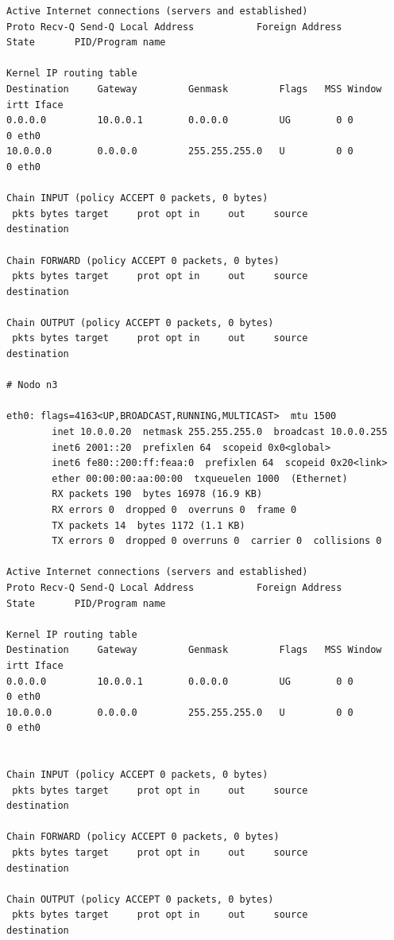 \begin{lstlisting}
Active Internet connections (servers and established)
Proto Recv-Q Send-Q Local Address           Foreign Address         State       PID/Program name 

Kernel IP routing table
Destination     Gateway         Genmask         Flags   MSS Window  irtt Iface
0.0.0.0         10.0.0.1        0.0.0.0         UG        0 0          0 eth0
10.0.0.0        0.0.0.0         255.255.255.0   U         0 0          0 eth0

Chain INPUT (policy ACCEPT 0 packets, 0 bytes)
 pkts bytes target     prot opt in     out     source               destination         

Chain FORWARD (policy ACCEPT 0 packets, 0 bytes)
 pkts bytes target     prot opt in     out     source               destination         

Chain OUTPUT (policy ACCEPT 0 packets, 0 bytes)
 pkts bytes target     prot opt in     out     source               destination 

# Nodo n3

eth0: flags=4163<UP,BROADCAST,RUNNING,MULTICAST>  mtu 1500
        inet 10.0.0.20  netmask 255.255.255.0  broadcast 10.0.0.255
        inet6 2001::20  prefixlen 64  scopeid 0x0<global>
        inet6 fe80::200:ff:feaa:0  prefixlen 64  scopeid 0x20<link>
        ether 00:00:00:aa:00:00  txqueuelen 1000  (Ethernet)
        RX packets 190  bytes 16978 (16.9 KB)
        RX errors 0  dropped 0  overruns 0  frame 0
        TX packets 14  bytes 1172 (1.1 KB)
        TX errors 0  dropped 0 overruns 0  carrier 0  collisions 0

Active Internet connections (servers and established)
Proto Recv-Q Send-Q Local Address           Foreign Address         State       PID/Program name    

Kernel IP routing table
Destination     Gateway         Genmask         Flags   MSS Window  irtt Iface
0.0.0.0         10.0.0.1        0.0.0.0         UG        0 0          0 eth0
10.0.0.0        0.0.0.0         255.255.255.0   U         0 0          0 eth0


Chain INPUT (policy ACCEPT 0 packets, 0 bytes)
 pkts bytes target     prot opt in     out     source               destination         

Chain FORWARD (policy ACCEPT 0 packets, 0 bytes)
 pkts bytes target     prot opt in     out     source               destination         

Chain OUTPUT (policy ACCEPT 0 packets, 0 bytes)
 pkts bytes target     prot opt in     out     source               destination         


\end{lstlisting}

